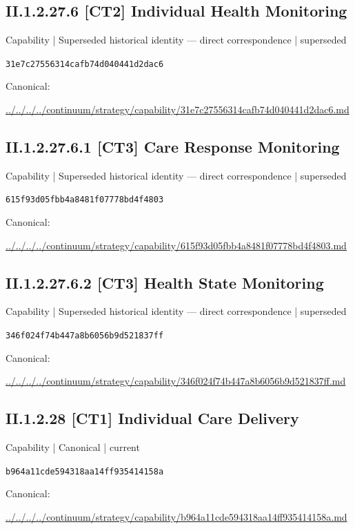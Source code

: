 \documentclass[10pt,a4paper]{article}
\begin{document}
\subsection*{II.1.2.27.6 [CT2] Individual Health Monitoring}
{\small Capability | Superseded historical identity — direct correspondence | superseded}\par
\texttt{31e7c27556314cafb74d040441d2dac6}\par
Canonical: \par
{\footnotesize\url{../../../../continuum/strategy/capability/31e7c27556314cafb74d040441d2dac6.md}}\par
\subsection*{II.1.2.27.6.1 [CT3] Care Response Monitoring}
{\small Capability | Superseded historical identity — direct correspondence | superseded}\par
\texttt{615f93d05fbb4a8481f07778bd4f4803}\par
Canonical: \par
{\footnotesize\url{../../../../continuum/strategy/capability/615f93d05fbb4a8481f07778bd4f4803.md}}\par
\subsection*{II.1.2.27.6.2 [CT3] Health State Monitoring}
{\small Capability | Superseded historical identity — direct correspondence | superseded}\par
\texttt{346f024f74b447a8b6056b9d521837ff}\par
Canonical: \par
{\footnotesize\url{../../../../continuum/strategy/capability/346f024f74b447a8b6056b9d521837ff.md}}\par
\subsection*{II.1.2.28 [CT1] Individual Care Delivery}
{\small Capability | Canonical | current}\par
\texttt{b964a11cde594318aa14ff935414158a}\par
Canonical: \par
{\footnotesize\url{../../../../continuum/strategy/capability/b964a11cde594318aa14ff935414158a.md}}\par
\end{document}

